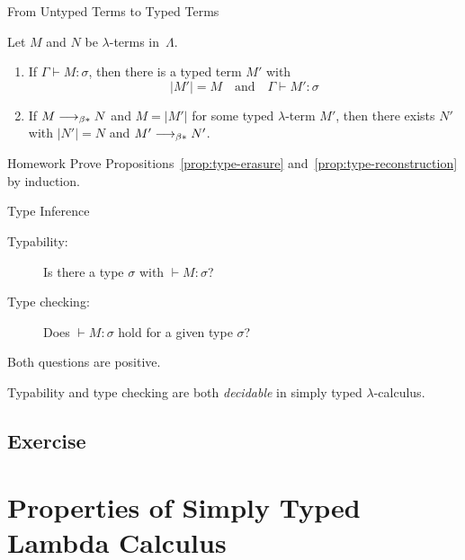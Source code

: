 \begin{frame}{From Untyped Terms to Typed Terms}
\begin{proposition}\label{prop:type-reconstruction}
  Let $M$ and $N$ be $\lambda$-terms in~$\Lambda$. 
  \begin{enumerate}
    \item If $\Gamma \vdash M : \sigma$, then there is a typed term $M'$ with 
      \[
        |M'| = M
        \quad\text{and}\quad
        \Gamma \vdash M' : \sigma
      \]
    \item If $M \longrightarrow_{\beta*} N$ and $M = |M'|$ for some typed $\lambda$-term $M'$,
      then there exists $N'$ with $|N'| = N$ and $M' \longrightarrow_{\beta*} N'$.
    \end{enumerate}
\end{proposition}
\begin{block}{Homework}
  Prove Propositions~\ref{prop:type-erasure} and~\ref{prop:type-reconstruction}
  by induction. 
\end{block}
\end{frame}
\begin{frame}{Type Inference}
\begin{description}
  \item[Typability:] Is there a type $\sigma$ with $\vdash M : \sigma$? 
  \item[Type checking:] Does $\vdash M : \sigma$ hold for a given type $\sigma$?
  \end{description}
Both questions are positive.

\begin{theorem}
  Typability and type checking are both \emph{decidable}
  in simply typed $\lambda$-calculus.
\end{theorem}

\subsection*{Exercise}
  
\end{frame}

\section{Properties of Simply Typed Lambda Calculus}
